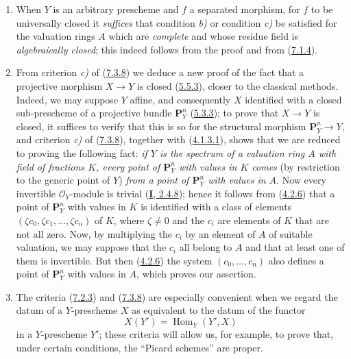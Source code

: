 \begin{remark}[7.3.9]
\label{II.7.3.9}
\begin{enumerate}
\item[\rm (i)] When $Y$ is an arbitrary prescheme and $f$ a separated
morphism, for $f$ to be universally closed it \emph{suffices} that
condition \emph{b)} or condition \emph{c)} be satisfied for the valuation rings
$A$ which are \emph{complete} and whose residue field is \emph{algebraically
closed}; this indeed follows from the proof and from
(\hyperref[II.7.1.4]{7.1.4}).
\item[\rm (ii)] From criterion \emph{c)} of
(\hyperref[II.7.3.8]{7.3.8}) we deduce a new proof of the fact that a
projective morphism $X\to Y$ is closed (\hyperref[II.5.5.3]{5.5.3}), closer
to the classical methods. Indeed, we may suppose $Y$ affine, and consequently
$X$ identified with a closed sub-prescheme of a projective bundle
$\mathbf{P}_Y^n$ (\hyperref[II.5.3.3]{5.3.3}); to prove that $X\to Y$
is closed, it suffices to verify that this is so for the structural morphism
$\mathbf{P}_Y^n\to Y$, and criterion \emph{c)} of
(\hyperref[II.7.3.8]{7.3.8}), together with
(\hyperref[II.4.1.3.1]{4.1.3.1}), shows that we are reduced to proving the
following fact: \emph{if $Y$ is the spectrum of a valuation ring $A$ with
field of fractions $K$, every point of $\mathbf{P}_Y^n$ with values in $K$
comes} (by restriction to the generic point of $Y$) \emph{from a point of
$\mathbf{P}_Y^n$ with values in $A$}. Now every invertible
$\mathcal{O}_Y$-module is trivial (\hyperref[I.2.4.8]{\textbf{I}, 2.4.8}); hence it
follows from (\hyperref[II.4.2.6]{4.2.6}) that a point of $\mathbf{P}_Y^n$
with values in $K$ is identified with a class of elements $(\zeta c_0,\zeta c_1,\ldots,\zeta
c_n)$ of $K$, where $\zeta\neq0$ and the $c_i$ are elements of $K$ that are
not all zero. Now, by multiplying the $c_i$ by an element of $A$ of
suitable valuation, we may suppose that the $c_i$ all belong to
$A$ and that at least one of them is invertible. But then
(\hyperref[II.4.2.6]{4.2.6}) the system $(c_0,\ldots,c_n)$ also defines
a point of $\mathbf{P}_Y^n$ with values in $A$, which proves our
assertion.
\item[\rm (iii)] The criteria (\hyperref[II.7.2.3]{7.2.3}) and
(\hyperref[II.7.3.8]{7.3.8}) are especially convenient when we regard the
datum of a $Y$-prescheme $X$ as equivalent to the datum of the functor
\[
X(Y')=\operatorname{Hom}_Y(Y',X)
\]
in a $Y$-prescheme $Y'$; these criteria will allow us, for example, to
prove that, under certain conditions, the ``Picard schemes'' are proper.
\end{enumerate}
\end{remark}

